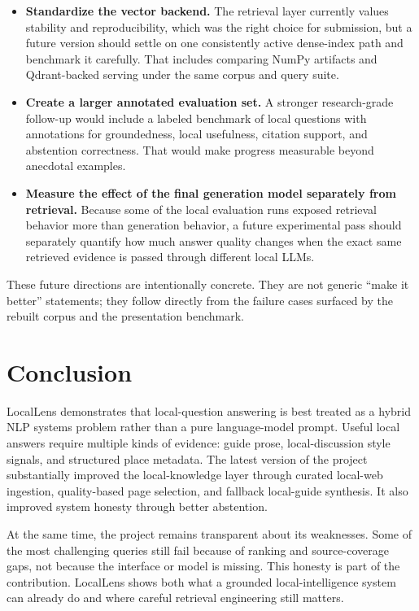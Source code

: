 \documentclass[11pt]{article}
\begin{document}
\begin{itemize}[leftmargin=*]
    \item \textbf{Standardize the vector backend.} The retrieval layer currently values stability and reproducibility, which was the right choice for submission, but a future version should settle on one consistently active dense-index path and benchmark it carefully. That includes comparing NumPy artifacts and Qdrant-backed serving under the same corpus and query suite.
    \item \textbf{Create a larger annotated evaluation set.} A stronger research-grade follow-up would include a labeled benchmark of local questions with annotations for groundedness, local usefulness, citation support, and abstention correctness. That would make progress measurable beyond anecdotal examples.
    \item \textbf{Measure the effect of the final generation model separately from retrieval.} Because some of the local evaluation runs exposed retrieval behavior more than generation behavior, a future experimental pass should separately quantify how much answer quality changes when the exact same retrieved evidence is passed through different local LLMs.
\end{itemize}

These future directions are intentionally concrete. They are not generic ``make it better'' statements; they follow directly from the failure cases surfaced by the rebuilt corpus and the presentation benchmark.

\section{Conclusion}
LocalLens demonstrates that local-question answering is best treated as a hybrid NLP systems problem rather than a pure language-model prompt. Useful local answers require multiple kinds of evidence: guide prose, local-discussion style signals, and structured place metadata. The latest version of the project substantially improved the local-knowledge layer through curated local-web ingestion, quality-based page selection, and fallback local-guide synthesis. It also improved system honesty through better abstention.

At the same time, the project remains transparent about its weaknesses. Some of the most challenging queries still fail because of ranking and source-coverage gaps, not because the interface or model is missing. This honesty is part of the contribution. LocalLens shows both what a grounded local-intelligence system can already do and where careful retrieval engineering still matters.
\end{document}

